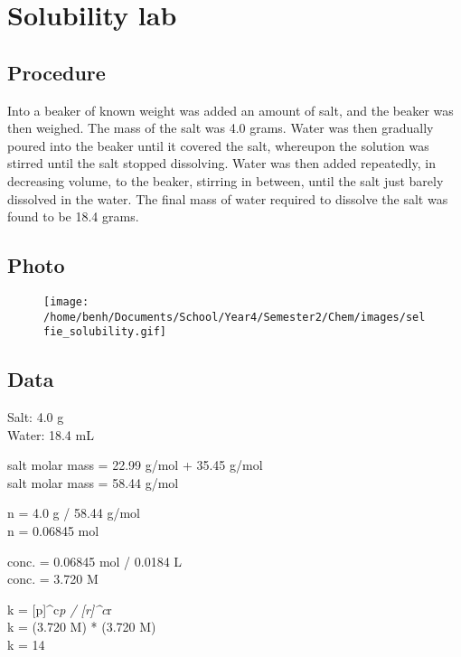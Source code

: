\documentclass[
]{article}
\author{}
\date{}
\begin{document}
\hypertarget{header-n0}{%
\section{Solubility lab}\label{header-n0}}

\hypertarget{header-n3}{%
\subsection{Procedure}\label{header-n3}}

Into a beaker of known weight was added an amount of salt, and the
beaker was then weighed. The mass of the salt was 4.0 grams. Water was
then gradually poured into the beaker until it covered the salt,
whereupon the solution was stirred until the salt stopped dissolving.
Water was then added repeatedly, in decreasing volume, to the beaker,
stirring in between, until the salt just barely dissolved in the water.
The final mass of water required to dissolve the salt was found to be
18.4 grams.

\hypertarget{header-n6}{%
\subsection{Photo}\label{header-n6}}

\begin{figure}
\centering
\texttt{[image: /home/benh/Documents/School/Year4/Semester2/Chem/images/selfie\_solubility.gif]}
\caption{}
\end{figure}

\hypertarget{header-n9}{%
\subsection{Data}\label{header-n9}}

Salt: 4.0 g\\
Water: 18.4 mL

salt molar mass = 22.99 g/mol + 35.45 g/mol\\
salt molar mass = 58.44 g/mol

n = 4.0 g / 58.44 g/mol\\
n = 0.06845 mol

conc. = 0.06845 mol / 0.0184 L\\
conc. = 3.720 M

k = {[}p{]}\^{}c\emph{p / {[}r{]}\^{}c}r\\
k = (3.720 M) * (3.720 M)\\
k = 14
\end{document}
